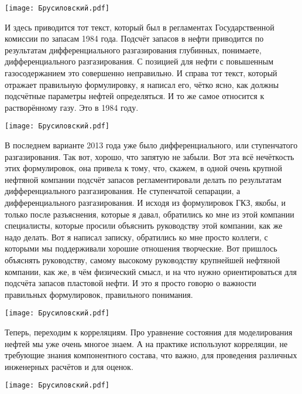 \documentclass[main.tex]{subfiles}
\begin{document}
\begin{center}
\texttt{[image: Брусиловский.pdf]}
\end{center}

И здесь приводится тот текст, который был в регламентах Государственной комиссии по запасам 1984 года.
Подсчёт запасов в нефти приводится по результатам дифференциального разгазирования глубинных, понимаете, дифференциального разгазирования.
С позицией для нефти с повышенным газосодержанием это совершенно неправильно.
И справа тот текст, который отражает правильную формулировку, я написал его, чётко ясно, как должны подсчётные параметры нефтей определяться.
И то же самое относится к растворённому газу.
Это в 1984 году.

\begin{center}
\texttt{[image: Брусиловский.pdf]}
\end{center}

В последнем варианте 2013 года уже было дифференциального, или ступенчатого разгазирования.
Так вот, хорошо, что запятую не забыли.
Вот эта всё нечёткость этих формулировок, она привела к тому, что, скажем, в одной очень крупной нефтяной компании подсчёт запасов регламентировали делать по результатам дифференциального разгазирования.
Не ступенчатой сепарации, а дифференциального разгазирования.
И исходя из формулировок ГКЗ, якобы, и только после разъяснения, которые я давал, обратились ко мне из этой компании специалисты, которые просили объяснить руководству этой компании, как же надо делать.
Вот я написал записку, обратились ко мне просто коллеги, с которыми мы поддерживали хорошие отношения творческие.
Вот пришлось объяснять руководству, самому высокому руководству крупнейшей нефтяной компании, как же, в чём физический смысл, и на что нужно ориентироваться для подсчёта запасов пластовой нефти.
И это я просто говорю о важности правильных формулировок, правильного понимания.

\begin{center}
\texttt{[image: Брусиловский.pdf]}
\end{center}

Теперь, переходим к корреляциям.
Про уравнение состояния для моделирования нефтей мы уже очень многое знаем.
А на практике используют корреляции, не требующие знания компонентного состава, что важно, для проведения различных инженерных расчётов и для оценок.

\begin{center}
\texttt{[image: Брусиловский.pdf]}
\end{center}
\end{document}
